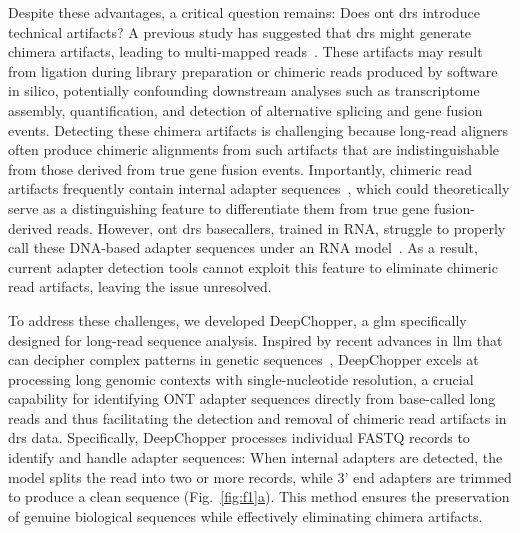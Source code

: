\documentclass[pdflatex,sn-nature, lineno]{sn-jnl}%
\newcommand{\figref}[2]{Fig.~\hyperref[#1]{\ref*{#1}#2}}
\theoremstyle{thmstyleone}%
\theoremstyle{thmstyletwo}%
\theoremstyle{thmstylethree}%
\begin{document}
Despite these advantages, a critical question remains: Does \gls{ont} \gls{drs} introduce technical artifacts?
A previous study has suggested that \gls{drs} might generate chimera artifacts, leading to multi-mapped reads~\cite{smith2020molecular}.
These artifacts may result from ligation during library preparation or chimeric reads produced by software in silico, potentially confounding downstream analyses such as transcriptome assembly, quantification, and detection of alternative splicing and gene fusion events.
Detecting these chimera artifacts is challenging because long-read aligners often produce chimeric alignments from such artifacts that are indistinguishable from those derived from true gene fusion events.
Importantly, chimeric read artifacts frequently contain internal adapter sequences~\cite{smith2020molecular}, which could theoretically serve as a distinguishing feature to differentiate them from true gene fusion-derived reads. However, \gls{ont} \gls{drs} basecallers, trained in RNA, struggle to properly call these DNA-based adapter sequences under an RNA model~\cite{liu2024sequencing}.
As a result, current adapter detection tools cannot exploit this feature to eliminate chimeric read artifacts, leaving the issue unresolved.

To address these challenges, we developed DeepChopper, a \gls{glm} specifically designed for long-read sequence analysis.
Inspired by recent advances in \gls{llm} that can decipher complex patterns in genetic sequences~\cite{benegas2024genomic}, DeepChopper excels at processing long genomic contexts with single-nucleotide resolution, a crucial capability for identifying ONT adapter sequences directly from base-called long reads and thus facilitating the detection and removal of chimeric read artifacts in \gls{drs} data.
Specifically, DeepChopper processes individual FASTQ records to identify and handle adapter sequences: When internal adapters are detected, the model splits the read into two or more records, while 3' end adapters are trimmed to produce a clean sequence (\figref{fig:f1}{a}).
This method ensures the preservation of genuine biological sequences while effectively eliminating chimera artifacts. 
\end{document}
